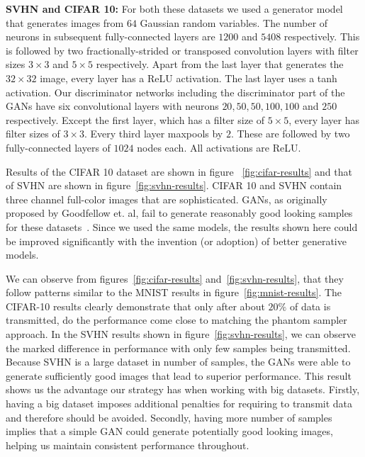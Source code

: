 \documentclass[10pt,twocolumn,letterpaper]{article}
\begin{document}
	\noindent\textbf{SVHN and CIFAR 10:} For both these datasets we used a generator model that generates images from $64$ Gaussian random variables. 
	The number of neurons in subsequent fully-connected layers are $1200$ and $5408$ respectively. 
	This is followed by two fractionally-strided or transposed convolution layers with filter sizes $3 \times 3$ and $5 \times 5$ respectively. 
	Apart from the last layer that generates the $32 \times 32$ image, every layer has a ReLU activation. 
	The last layer uses a tanh activation. 
	Our discriminator networks including the discriminator part of the GANs have six convolutional layers with neurons $20, 50, 50, 100, 100$ and $250$ respectively. 
	Except the first layer, which has a filter size of $5 \times 5$, every layer has filter sizes of $3 \times 3$.
	Every third layer maxpools by $2$. 
	These are followed by two fully-connected layers of $1024$ nodes each. 
	All activations are ReLU.
	
	Results of the CIFAR 10 dataset are shown in figure ~\ref{fig:cifar-results} and that of SVHN are shown in figure~\ref{fig:svhn-results}.
	CIFAR 10 and SVHN contain three channel full-color images that are sophisticated.
	GANs, as originally proposed by Goodfellow et. al, fail to generate reasonably good looking samples for these datasets~\cite{goodfellow2014generative}.
	Since we used the same models, the results shown here could be improved significantly with the invention (or adoption) of better generative models.
	
	We can observe from figures~\ref{fig:cifar-results} and~\ref{fig:svhn-results}, that they follow patterns similar to the MNIST results in figure~\ref{fig:mnist-results}.
	The CIFAR-10 results clearly demonstrate that only after about $20\%$ of data is transmitted, do the performance come close to matching the phantom sampler approach. 
	In the SVHN results shown in figure~\ref{fig:svhn-results}, we can observe the marked difference in performance with only few samples being transmitted.
	Because SVHN is a large dataset in number of samples, the GANs were able to generate sufficiently good images that lead to superior performance.
	This result shows us the advantage our strategy has when working with big datasets.
	Firstly, having a big dataset imposes additional penalties for requiring to transmit data and therefore should be avoided. 
	Secondly, having more number of samples implies that a simple GAN could generate potentially good looking images, helping us maintain consistent performance throughout. 
	
\end{document}
